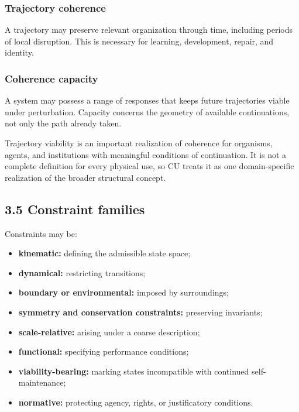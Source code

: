 \documentclass[
  11pt,
]{article}
\providecommand{\tightlist}{%
  \setlength{\itemsep}{0pt}\setlength{\parskip}{0pt}}
\begin{document}
\subsubsection{Trajectory coherence}\label{trajectory-coherence}

A trajectory may preserve relevant organization through time, including
periods of local disruption. This is necessary for learning,
development, repair, and identity.

\subsubsection{Coherence capacity}\label{coherence-capacity}

A system may possess a range of responses that keeps future trajectories
viable under perturbation. Capacity concerns the geometry of available
continuations, not only the path already taken.

Trajectory viability is an important realization of coherence for
organisms, agents, and institutions with meaningful conditions of
continuation. It is not a complete definition for every physical use, so
CU treats it as one domain-specific realization of the broader
structural concept.

\subsection{3.5 Constraint families}\label{constraint-families}

Constraints may be:

\begin{itemize}
\tightlist
\item
  \textbf{kinematic:} defining the admissible state space;
\item
  \textbf{dynamical:} restricting transitions;
\item
  \textbf{boundary or environmental:} imposed by surroundings;
\item
  \textbf{symmetry and conservation constraints:} preserving invariants;
\item
  \textbf{scale-relative:} arising under a coarse description;
\item
  \textbf{functional:} specifying performance conditions;
\item
  \textbf{viability-bearing:} marking states incompatible with continued
  self-maintenance;
\item
  \textbf{normative:} protecting agency, rights, or justificatory
  conditions.
\end{itemize}
\end{document}

